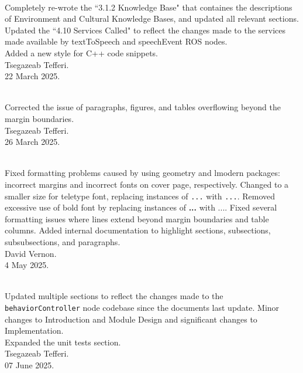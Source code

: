 \documentclass{CSSRforAfrica}
\begin{document}
\begin{description}
\newpage
\item [Version 1.5]~\\
Completely re-wrote the ``3.1.2 Knowledge Base" that containes the descriptions of Environment and Cultural Knowledge Bases, and updated all relevant sections. \\
Updated the ``4.10 Services Called" to reflect the changes made to the services made available by textToSpeech and speechEvent ROS nodes.\\
Added a new style for C++ code snippets.\\
Tsegazeab Tefferi. \\                            
22 March 2025.

\item [Version 1.6]~\\
Corrected the issue of paragraphs, figures, and tables overflowing beyond the margin boundaries. \\
Tsegazeab Tefferi. \\                            
26 March 2025.

\item [Version 1.7]~\\
Fixed formatting problems caused by using geometry and lmodern packages: incorrect margins and incorrect fonts on cover page, respectively.  Changed to a smaller size for teletype font, replacing instances of \texttt{...} with \texttt{\small ...}.  Removed excessive use of bold font by replacing instances of \textbf{...} with \textnormal{...}. Fixed several formatting issues where lines extend beyond margin boundaries and table columns.  Added internal documentation to highlight sections, subsections, subsubsections, and paragraphs.\\
David Vernon. \\                            
4 May 2025.


\item [Version 1.8]~\\
Updated multiple sections to reflect the changes made to the \texttt{\small behaviorController} node codebase since the documents last update. Minor changes to Introduction and Module Design and significant changes to Implementation.\\
Expanded the unit tests section.\\
Tsegazeab Tefferi. \\                            
07 June 2025.



\end{description}
\end{document}
